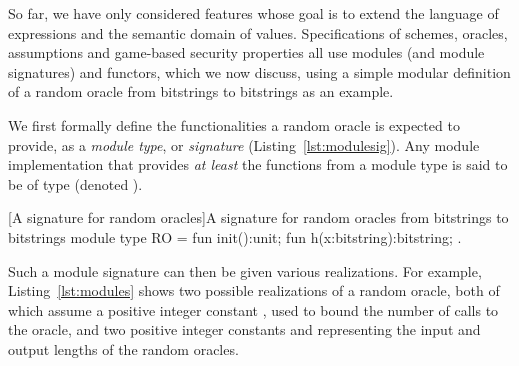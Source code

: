 So far, we have only considered features whose goal is to extend the language of
expressions and the semantic domain of values. Specifications of schemes,
oracles, assumptions and game-based security properties all use modules (and
module signatures) and functors, which we now discuss, using a simple modular
definition of a random oracle from bitstrings to bitstrings as an example.

We first formally define the functionalities a random oracle is expected to
provide, as a \emph{module type}, or \emph{signature}
(Listing~\ref{lst:modulesig}). Any module implementation  that provides
\emph{at least} the functions from a module type  is said to be of
type  (denoted ).

\begin{easycrypt}[label={lst:modulesig}]{[A signature for random oracles]A signature for random oracles from bitstrings to bitstrings}
module type RO = {
  fun init():unit;
  fun h(x:bitstring):bitstring; }.
\end{easycrypt}

Such a module signature can then be given various realizations. For example, Listing~\ref{lst:modules} shows two possible realizations of a random oracle, both of which assume a positive integer constant , used to bound the number of calls to the oracle, and two positive integer constants  and  representing the input and output lengths of the random oracles.

